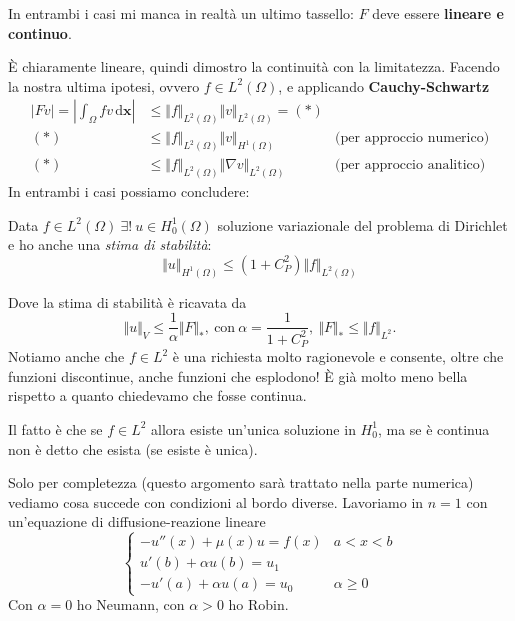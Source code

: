 \documentclass[10pt,a4paper,twoside,openright]{book}
\newcommand{\x}{\mathbf{x}}
\newcommand{\de}{\,\mathrm d}
\newcommand{\dxx}{\de \x}
\begin{document}
In entrambi i casi mi manca in realtà un ultimo tassello: $F$ deve essere \textbf{lineare e continuo}.

È chiaramente lineare, quindi dimostro la continuità con la limitatezza. Facendo la nostra ultima ipotesi, ovvero $\displaystyle f\in L^{2}(\Omega)$, e applicando \textbf{Cauchy-Schwartz}
\begin{align*}
    | Fv| =\left| \int _{\Omega } fv\dxx\right| & \leqslant \Vert f\Vert _{L^{2}(\Omega)}\Vert v\Vert _{L^{2}(\Omega)} =(*)   &                                  \\
    (*)                                         & \leqslant \Vert f\Vert _{L^{2}(\Omega)}\Vert v\Vert _{H^{1}(\Omega)}        & \text{(per approccio numerico)}  \\
    (*)                                         & \leqslant \Vert f\Vert _{L^{2}(\Omega)}\Vert \nabla v\Vert _{L^{2}(\Omega)} & \text{(per approccio analitico)}
\end{align*}
In entrambi i casi possiamo concludere:
\begin{theorem}
    Data $\displaystyle f\in L^{2}(\Omega) \ \exists !\ u\in H_{0}^{1}(\Omega)$ soluzione variazionale del problema di Dirichlet e ho anche una \textit{stima di stabilità}:
    \begin{equation*}
        \Vert u\Vert _{H^{1}(\Omega)} \leqslant \left(1+C_{P}^{2}\right)\Vert f\Vert _{L^{2}(\Omega)}
    \end{equation*}
\end{theorem}
Dove la stima di stabilità è ricavata da
\begin{equation*}
    \Vert u\Vert _{V} \leqslant \frac{1}{\alpha }\Vert F\Vert _{*} ,\ \text{con} \ \alpha =\frac{1}{1+C_{P}^{2}} ,\ \Vert F\Vert _{*} \leqslant \Vert f\Vert _{L^{2}} .
\end{equation*}
Notiamo anche che $\displaystyle f\in L^{2}$ è una richiesta molto ragionevole e consente, oltre che funzioni discontinue, anche funzioni che esplodono! È già molto meno bella rispetto a quanto chiedevamo che fosse continua.

Il fatto è che se $\displaystyle f\in L^{2}$ allora esiste un'unica soluzione in $\displaystyle H_{0}^{1}$, ma se è continua non è detto che esista (se esiste è unica).

Solo per completezza (questo argomento sarà trattato nella parte numerica) vediamo cosa succede con condizioni al bordo diverse. Lavoriamo in $n=1$ con un'equazione di diffusione-reazione lineare
\begin{equation*}
    \begin{cases}
        -u''(x) +\mu (x) u=f(x)    & a< x< b            \\
        u'(b) +\alpha u(b) =u_{1}  &                    \\
        -u'(a) +\alpha u(a) =u_{0} & \alpha \geqslant 0
    \end{cases}
\end{equation*}
Con $\displaystyle \alpha =0$ ho Neumann, con $\displaystyle \alpha  >0$ ho Robin.
\end{document}
